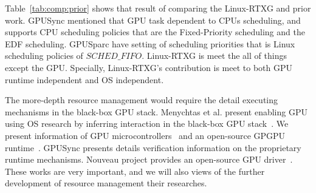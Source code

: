 Table~\ref{tab:comp:prior} shows that result of comparing the Linux-RTXG and prior work.
GPUSync mentioned that GPU task dependent to CPUs scheduling, and supports CPU scheduling policies that are the Fixed-Priority scheduling and the EDF scheduling.
GPUSparc have setting of scheduling priorities that is Linux scheduling policies of $SCHED\_FIFO$.
Linux-RTXG is meet the all of things except the GPU.
Specially, Linux-RTXG's contribution is meet to both GPU runtime independent and OS independent.

The more-depth resource management would require the detail executing mechanisms in the black-box GPU stack.
Menychtas et al. present enabling GPU using OS research by inferring interaction in the black-box GPU stack~\cite{menychtas2013enabling}.
We present information of GPU microcontrollers~\cite{fujii:apsys2013} and an open-source GPGPU runtime~\cite{kato:gdev}.
GPUSync presents details verification information on the proprietary runtime mechanisms.
Nouveau project provides an open-source GPU driver~\cite{nouveau}.
These works are very important, and we will also views of the further development of resource management their researches.


